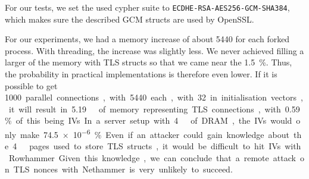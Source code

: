 For our tests, we set the used cypher suite to
\mbox{\texttt{ECDHE-RSA-AES256-GCM-SHA384}}, which makes sure the described GCM
structs are used by OpenSSL.

For our experiments, we had a memory increase of about \SI{5440}{\byte} for each
forked process. With threading, the increase was slightly less. We never
achieved filling a larger of the memory with TLS structs so that we came near
the \SI{1.5}{\percent}. Thus, the probability in practical implementations is
therefore even lower. If it is possible to get \SI{1000} parallel connections,
with \SI{5440}{\byte} each, with \SI{32}{\byte} in initialisation vectors, it
will result in \SI{5.19}{\mega\byte} of memory representing TLS connections,
with \SI{0.59}{\percent} of this being IVs. In a server setup with
\SI{4}{\giga\byte} of DRAM, the IVs would only make \SI{74.5e-6}{\percent}. Even
if an attacker could gain knowledge about the \SI{4}{\kilo\byte} pages used to
store TLS structs, it would be difficult to hit IVs with Rowhammer. Given this
knowledge, we can conclude that a remote attack on TLS nonces with Nethammer is
very unlikely to succeed.

